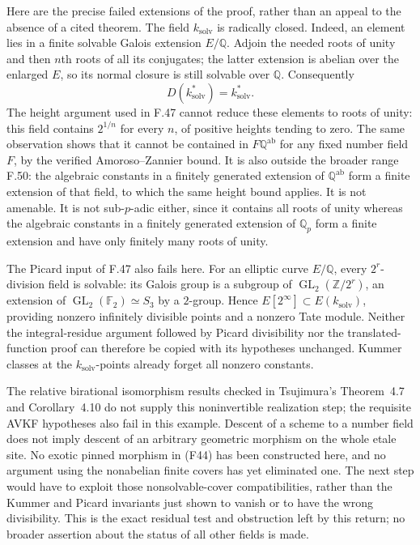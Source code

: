 Here are the precise failed extensions of the proof, rather than
an appeal to the absence of a cited theorem. The field
$k_{\mathrm{solv}}$ is radically closed. Indeed, an element lies
in a finite solvable Galois extension $E/\mathbb Q$. Adjoin the
needed roots of unity and then $n$th roots of all its conjugates;
the latter extension is abelian over the enlarged $E$, so its
normal closure is still solvable over $\mathbb Q$. Consequently
\[
       D(k_{\mathrm{solv}}^*)=k_{\mathrm{solv}}^*.
\]
The height argument used in F.47 cannot reduce these elements to
roots of unity: this field contains $2^{1/n}$ for every $n$, of
positive heights tending to zero. The same observation shows that
it cannot be contained in $F\mathbb Q^{\mathrm{ab}}$ for any
fixed number field $F$, by the verified Amoroso--Zannier bound.
It is also outside the broader range F.50: the algebraic constants
in a finitely generated extension of $\mathbb Q^{\mathrm{ab}}$
form a finite extension of that field, to which the same height
bound applies.
It is not amenable. It is not sub-$p$-adic either, since it contains
all roots of unity whereas the algebraic constants in a finitely
generated extension of $\mathbb Q_p$ form a finite extension and
have only finitely many roots of unity.

The Picard input of F.47 also fails here. For an elliptic curve
$E/\mathbb Q$, every $2^r$-division field is solvable: its Galois
group is a subgroup of
$\operatorname{GL}_2(\mathbb Z/2^r)$, an extension of
$\operatorname{GL}_2(\mathbb F_2)\simeq S_3$ by a $2$-group.
Hence $E[2^\infty]\subset E(k_{\mathrm{solv}})$, providing
nonzero infinitely divisible points and a nonzero Tate module.
Neither the integral-residue argument followed by Picard
divisibility nor the translated-function proof can therefore be
copied with its hypotheses unchanged. Kummer classes at the
$k_{\mathrm{solv}}$-points already forget all nonzero constants.

The relative birational isomorphism results checked in
Tsujimura's Theorem~4.7 and Corollary~4.10 \cite{Tsujimura2022}
do not supply this noninvertible realization step; the requisite
AVKF hypotheses also fail in this example. Descent of a scheme to
a number field does not imply descent of an arbitrary geometric
morphism on the whole etale site. No exotic pinned morphism in
(F44) has been constructed here, and no argument using the
nonabelian finite covers has yet eliminated one. The next step
would have to exploit those nonsolvable-cover compatibilities,
rather than the Kummer and Picard invariants just shown to vanish
or to have the wrong divisibility. This is the exact residual
test and obstruction left by this return; no broader assertion
about the status of all other fields is made.

